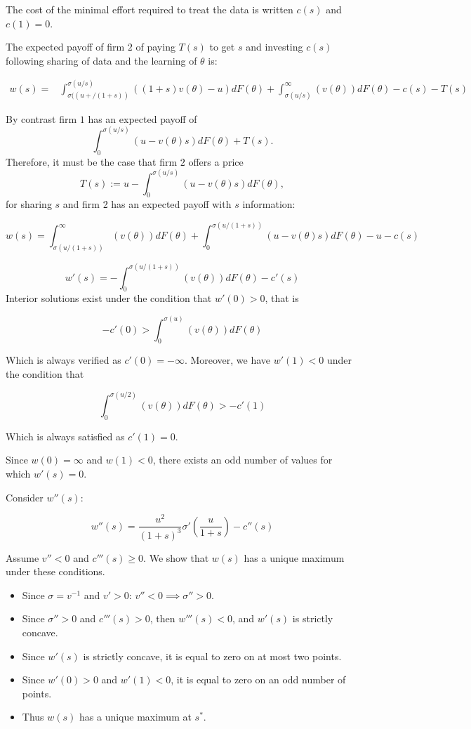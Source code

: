 \documentclass[a4paper,leqno]{article}%
\renewcommand{\t}{\theta}
\newcommand{\s}{\sigma}
\begin{document}
The cost of the minimal effort required to treat the data is written $c(s)$ and $c(1)=0$. 

The expected payoff of firm $2$ of paying $T(s)$ to get $s$ and investing $c(s)$ following sharing of data and the learning of $\t$ is:
%


\begin{equation}
    \begin{aligned}
w(s)=&\int_{\s((u+/(1+s))}^{\s(u/s)} ((1+s)v(\t)-u)dF(\t)+\int_{\s(u/s)}^\infty (v(\t))dF(\t)-c(s)-T(s)
\end{aligned}
\end{equation}

By contrast firm $1$ has an expected payoff of 
\begin{equation}\label{value-merger-firm1}
    \int_{0}^{\s(u/s)}(u-v(\t)s)dF(\t)+T(s).
\end{equation}
%
Therefore, it must be the case that firm $2$ offers a price
%
\[
T(s):=u-\int_{0}^{\s(u/s)}(u-v(\t)s)dF(\t),
\]
%
for sharing $s$ and firm 2 has an expected payoff with $s$ information:


\[
w(s)=\int_{\s(u/(1+s))}^\infty (v(\t))dF(\t)+\int_{0}^{\s(u/(1+s))}(u-v(\t)s)dF(\t)-u-c(s)
\]

\[
w'(s)=-\int_{0}^{\s(u/(1+s))}(v(\t))dF(\t)-c'(s)
\]
Interior solutions exist under the condition that $w'(0)>0$, that is

\[
-c'(0)>\int_{0}^{\s(u)}(v(\t))dF(\t)
\]

Which is always verified as $c'(0)=-\infty$. Moreover, we have $w'(1)<0$ under the condition that

\[
\int_{0}^{\s(u/2)}(v(\t))dF(\t)> -c'(1)
\]


Which is always satisfied as $c'(1)=0$.

%

Since $w(0)=\infty$ and $w(1)<0$, there exists an odd number of values for which $w'(s)=0$. 

Consider $w''(s)$:

\[
w''(s)=\frac{u^2}{(1+s)^3}\s'(\frac{u}{1+s})-c''(s)
\]

\medskip 

Assume $v''<0$ and $c'''(s)\geq0$. We show that $w(s)$ has a unique maximum under these conditions.

\begin{itemize}
    \item Since $\s=v^{-1}$ and $v'>0$: $v''<0\implies \s''>0$.
    \item Since $\s''>0$ and $c'''(s)>0$, then $w'''(s)<0$, and $w'(s)$ is strictly concave.
    \item Since $w'(s)$ is strictly concave, it is equal to zero on at most two points.
    \item Since $w'(0)>0$ and $w'(1)<0$, it is equal to zero on an odd number of points.
    \item Thus $w(s)$ has a unique maximum at $s^*$.
\end{itemize}
\end{document}

